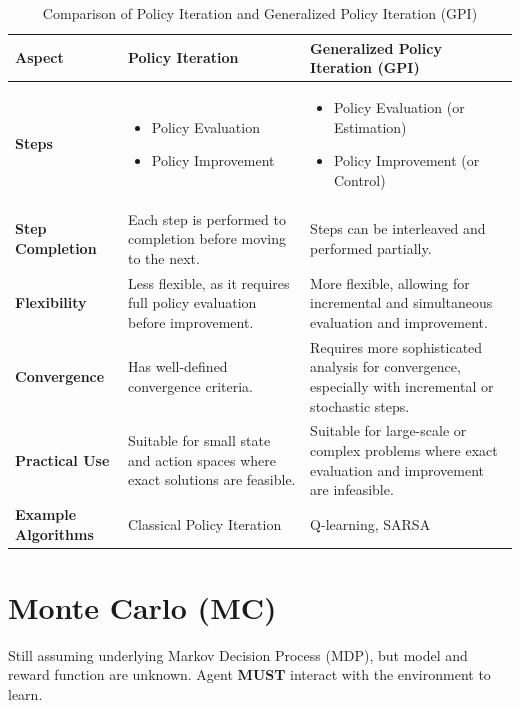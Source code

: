 \begin{table}[h]
    \centering
    \begin{tabular}{|l|p{5cm}|p{5cm}|}
        \hline
        \textbf{Aspect} & \textbf{Policy Iteration} & \textbf{Generalized Policy Iteration (GPI)} \\
        \hline
        \textbf{Steps} & 
        \begin{itemize}
            \item Policy Evaluation
            \item Policy Improvement
        \end{itemize} & 
        \begin{itemize}
            \item Policy Evaluation (or Estimation)
            \item Policy Improvement (or Control)
        \end{itemize} \\
        \hline
        \textbf{Step Completion} & 
        Each step is performed to completion before moving to the next. & 
        Steps can be interleaved and performed partially. \\
        \hline
        \textbf{Flexibility} & 
        Less flexible, as it requires full policy evaluation before improvement. & 
        More flexible, allowing for incremental and simultaneous evaluation and improvement. \\
        \hline
        \textbf{Convergence} & 
        Has well-defined convergence criteria. & 
        Requires more sophisticated analysis for convergence, especially with incremental or stochastic steps. \\
        \hline
        \textbf{Practical Use} & 
        Suitable for small state and action spaces where exact solutions are feasible. & 
        Suitable for large-scale or complex problems where exact evaluation and improvement are infeasible. \\
        \hline
        \textbf{Example Algorithms} & 
        Classical Policy Iteration & 
        Q-learning, SARSA \\
        \hline
    \end{tabular}
    \caption{Comparison of Policy Iteration and Generalized Policy Iteration (GPI)}
\end{table}


\section{Monte Carlo (MC)}\label{Monte Carlo (MC)}
Still assuming underlying Markov Decision Process (MDP), but model and reward function are unknown. Agent \textbf{MUST} interact with the environment to learn.

